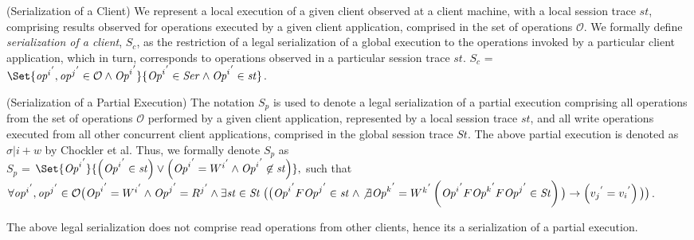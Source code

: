 \documentclass{sig-alternate-05-2015}
\begin{document}
 \begin{definition}(Serialization of a Client)
    We  represent a local execution of a given client observed at a client machine, with a local session trace $\mathit{st} $, comprising results observed for operations executed by a given client application, comprised in the set of operations $\mathcal{O}$.  We formally define \emph{serialization of a client}, $S_c$, as the restriction of a legal serialization of a global execution
    to  the operations invoked by a particular client application, which in turn,
    corresponds to operations observed in a particular session trace $\mathit{st}$.
     $S_c$ = $ \Set{ {\mathit{op}^i}^{'}, {\mathit{op}^j}^{'} \in \mathcal{O} \wedge {\mathit{Op}^i}^{'} } {{\mathit{Op}^i}^{'} \in \mathit{Ser} \wedge {\mathit{Op}^i}^{'} \in \mathit{st} } $.
    \end{definition}\label{def:clientser}
   \begin{definition}(Serialization of a Partial Execution)
   The notation $S_p$ is used to denote a legal serialization of a partial execution comprising all    operations from the set of operations $\mathcal{O}$
    performed by a given client application, represented by a local session trace $\mathit{st}$, and all write
  operations  executed from all other concurrent client applications, comprised in the global session trace $\mathit{St}$. The above partial execution is denoted as $\sigma |i + w$ by Chockler et al. Thus, we formally denote $S_p$ as
    \\ $S_p$ = $\Set{ {\mathit{Op}^i}^{'} } { \left( {\mathit{Op}^i}^{'} \in \mathit{st} \right) \vee \left(
   {\mathit{Op}^i}^{'} = {W^i}^{'} \wedge {\mathit{Op}^i}^{'} \not\in \mathit{st} \right)}, $ such that
   $\forall {\mathit{op}^i}^{'}, {\mathit{op}^j}^{'} \in \mathcal{O} \big( {\mathit{Op}^i}^{'} = {W^i}^{'} \wedge {\mathit{Op}^j}^{'} = {R^j}^{'}  \wedge \\ \exists \mathit{st} \in \mathit{St}  \; \big( \big( {\mathit{Op}^i}^{'} F {\mathit{Op}^j}^{'} \in \mathit{st}  \; \wedge \not\exists {\mathit{Op}^k}^{'} = {W^k}^{'} \\ \left( {\mathit{Op}^i}^{'}  F {\mathit{Op}^k}^{'} F {\mathit{Op}^j}^{'} \in \mathit{St}  \right) \big)
   \rightarrow \left( {v_j}^{'} = {v_i}^{'} \right) \big) \big)$.
   \end{definition}\label{def:parser}
   The above legal serialization does not comprise read operations from other clients, hence its a  serialization of a partial execution.
\end{document}
